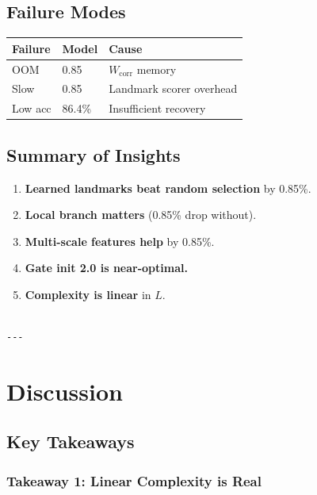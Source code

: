 \subsection{Failure Modes}

\begin{table}[H]
\centering
\small
\begin{tabular}{lll}
\toprule
\textbf{Failure} & \textbf{Model} & \textbf{Cause} \\
\midrule
OOM & 0.85 & $W_\text{corr}$ memory \\
Slow & 0.85 & Landmark scorer overhead \\
Low acc & 86.4\% & Insufficient recovery \\
\bottomrule
\end{tabular}
\end{table}

\subsection{Summary of Insights}

\begin{enumerate}
\item \textbf{Learned landmarks beat random selection} by 0.85\%.
\item \textbf{Local branch matters} (0.85\% drop without).
\item \textbf{Multi-scale features help} by 0.85\%.
\item \textbf{Gate init 2.0 is near-optimal.}
\item \textbf{Complexity is linear} in $L$.
\end{enumerate}
\begin{lstlisting}

---
\end{lstlisting}

\section{Discussion}

\subsection{Key Takeaways}

\subsubsection{Takeaway 1: Linear Complexity is Real}

